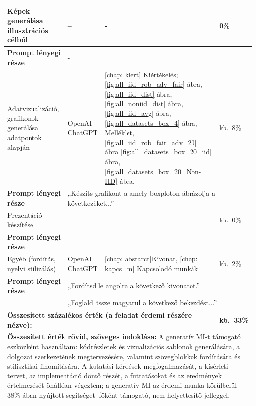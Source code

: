 \begin{table}[H]
\begin{tabular}{|p{2.7cm}|p{2.6cm}|p{7.4cm}|p{1.5cm}|}
Képek generálása illusztrációs célból 
  & -- 
  & - 
  & 0\% \\ \hline
\textbf{Prompt lényegi része}  
  & \multicolumn{3}{|p{11.5cm}|}{-} \\ \hline\hline

Adatvizualizáció, grafikonok generálása adatpontok alapján 
  & \makecell{OpenAI\\ChatGPT}
  & \ref{chap: kiert} Kiértékelés;
    \ref{fig:all_iid_rob_adv_fair} ábra,
    \ref{fig:all_iid_dist} ábra,
    \ref{fig:all_noniid_dist} ábra,
    \ref{fig:all_iid_avg} ábra,
    \ref{fig:all_datasets_box_4} ábra,
     Melléklet,
    \ref{fig:all_iid_rob_fair_adv_20} ábra
    \ref{fig:all_datasets_box_20_iid} ábra,
    \ref{fig:all_datasets_box_20_Non-IID} ábra, 
  & kb.\ 8\% \\ \hline
\textbf{Prompt lényegi része}  
  & \multicolumn{3}{|p{11.5cm}|}{„Készíts grafikont a amely boxploton ábrázolja a következőket...”} \\ \hline\hline

Prezentáció készítése 
  & --
  & -
  & kb.\ 0\% \\ \hline
\textbf{Prompt lényegi része}  
  & \multicolumn{3}{|p{11.5cm}|}{-} \\ \hline\hline

Egyéb (fordítás, nyelvi stilizálás) 
  & \makecell{OpenAI\\ChatGPT}
  & \ref{chap: abstarct}{Kivonat}, \ref{chap: kapcs_m} Kapcsolodó munkák
  & kb.\ 2\% \\ \hline
\textbf{Prompt lényegi része}  
  & \multicolumn{3}{|p{11.5cm}|}{„Fordítsd le angolra a következő kivonatot.”}\\[2pt]
  & \multicolumn{3}{|p{11.5cm}|}{
  „Foglald össze magyarul a következő bekezdést...”} \\ \hline\hline

\multicolumn{3}{|p{11.5cm}|}{\textbf{Összesített százalékos érték (a feladat érdemi részére nézve):}} 
  & \textbf{kb.\ 33\%} \\ \hline

\multicolumn{4}{|p{14.3cm}|}{\textbf{Összesített érték rövid, szöveges indoklása:} 
A generatív MI-t támogató eszközként használtam:  kódrészletek és vizualizációs sablonok generálására, a dolgozat szerkezetének megtervezésére, valamint szövegblokkok fordítására és stilisztikai finomítására. A kutatási kérdések megfogalmazását, a kísérleti tervet, az implementáció döntő részét, a futtatásokat és az eredmények értelmezését önállóan végeztem; a generatív MI az érdemi munka körülbelül 38\%-ában nyújtott segítséget, főként támogató, nem helyettesítő jelleggel.} \\ \hline

\end{tabular}

\end{table}



